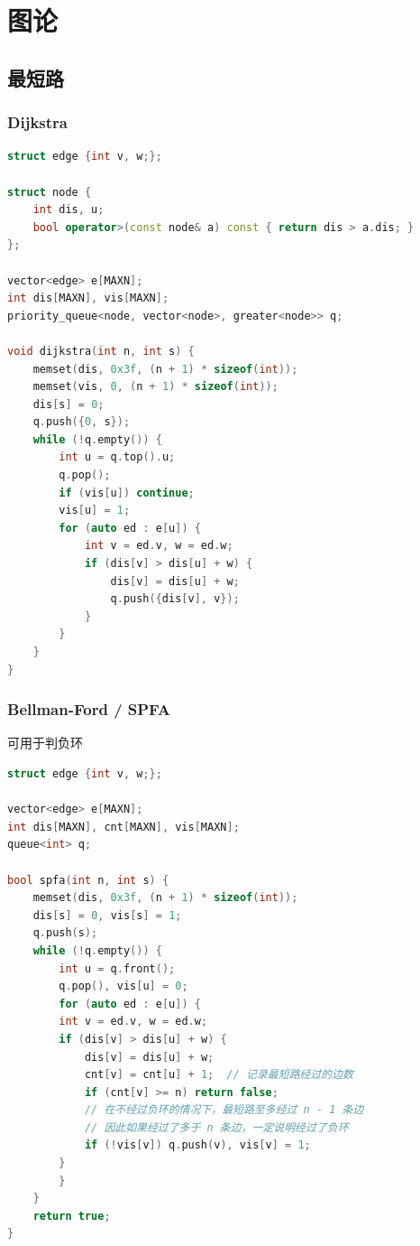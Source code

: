 \section{图论}

\subsection{最短路}

\subsubsection{Dijkstra}

\begin{lstlisting}[language=C++]
struct edge {int v, w;};

struct node {
    int dis, u;
    bool operator>(const node& a) const { return dis > a.dis; }
};

vector<edge> e[MAXN];
int dis[MAXN], vis[MAXN];
priority_queue<node, vector<node>, greater<node>> q;

void dijkstra(int n, int s) {
    memset(dis, 0x3f, (n + 1) * sizeof(int));
    memset(vis, 0, (n + 1) * sizeof(int));
    dis[s] = 0;
    q.push({0, s});
    while (!q.empty()) {
        int u = q.top().u;
        q.pop();
        if (vis[u]) continue;
        vis[u] = 1;
        for (auto ed : e[u]) {
            int v = ed.v, w = ed.w;
            if (dis[v] > dis[u] + w) {
                dis[v] = dis[u] + w;
                q.push({dis[v], v});
            }
        }
    }
}
\end{lstlisting}

\subsubsection{Bellman-Ford / SPFA}

可用于判负环

\begin{lstlisting}[language=C++]
struct edge {int v, w;};

vector<edge> e[MAXN];
int dis[MAXN], cnt[MAXN], vis[MAXN];
queue<int> q;

bool spfa(int n, int s) {
    memset(dis, 0x3f, (n + 1) * sizeof(int));
    dis[s] = 0, vis[s] = 1;
    q.push(s);
    while (!q.empty()) {
        int u = q.front();
        q.pop(), vis[u] = 0;
        for (auto ed : e[u]) {
        int v = ed.v, w = ed.w;
        if (dis[v] > dis[u] + w) {
            dis[v] = dis[u] + w;
            cnt[v] = cnt[u] + 1;  // 记录最短路经过的边数
            if (cnt[v] >= n) return false;
            // 在不经过负环的情况下，最短路至多经过 n - 1 条边
            // 因此如果经过了多于 n 条边，一定说明经过了负环
            if (!vis[v]) q.push(v), vis[v] = 1;
        }
        }
    }
    return true;
}
\end{lstlisting}

